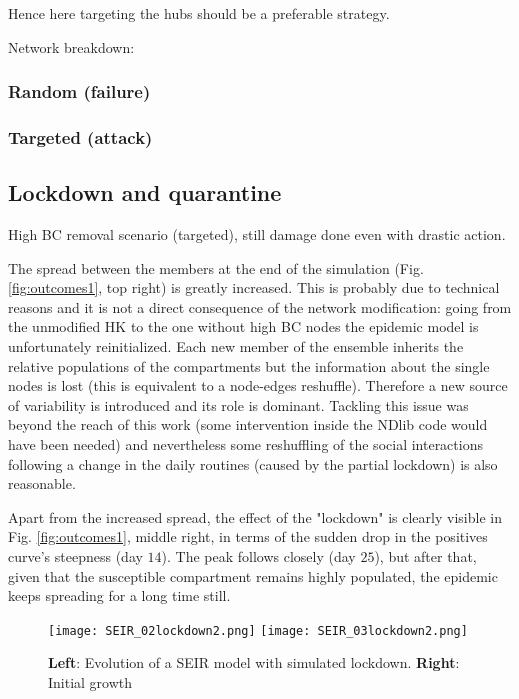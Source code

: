 \documentclass[DIV=12, BCOR=0pt]{scrartcl}  %
\begin{document}
	Hence here targeting the hubs should be a preferable strategy.  
	
	Network breakdown:
	\subsubsection{Random (failure)}
	\subsubsection{Targeted (attack)}

 
  
	\subsection{Lockdown and quarantine}
	High BC removal scenario (targeted), still damage done even with drastic action.
	
	The spread between the members at the end of the simulation (Fig. \ref{fig:outcomes1}, top right) is greatly increased. This is probably due to technical reasons and it is not a direct consequence of the network modification: going from the unmodified HK to the one without high BC nodes the epidemic model is unfortunately reinitialized. Each new member of the ensemble inherits the relative populations of the compartments but the information about the single nodes is lost (this is equivalent to a node-edges reshuffle). Therefore a new source of variability is introduced and its role is dominant. Tackling this issue was beyond the reach of this work (some intervention inside the NDlib code would have been needed) and nevertheless some reshuffling of the social interactions following a change in the daily routines (caused by the partial lockdown) is also reasonable.
	
	Apart from the increased spread, the effect of the "lockdown" is clearly visible in Fig. \ref{fig:outcomes1}, middle right, in terms of the sudden drop in the positives curve's steepness (day $14$). The peak follows closely (day $25$), but after that, given that the susceptible compartment remains highly populated, the epidemic keeps spreading for a long time still.
 	
 	
 	\begin{figure}[h]
		\centering
		\texttt{[image: SEIR\_02lockdown2.png]}
		\texttt{[image: SEIR\_03lockdown2.png]}
		\caption{\textbf{Left}: Evolution of a SEIR model with simulated lockdown. \textbf{Right}: Initial growth }
		\label{fig:SEIRlock}
	\end{figure}
	
\end{document}
